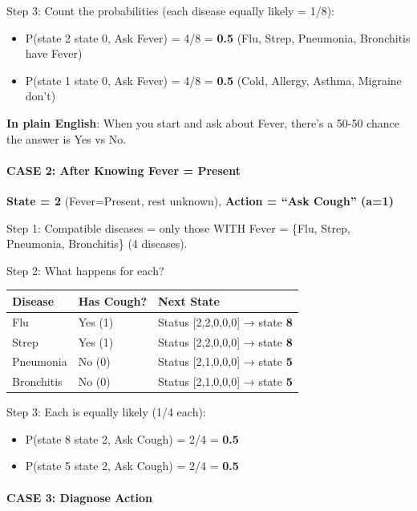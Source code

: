 \documentclass[
]{article}
\providecommand{\tightlist}{%
  \setlength{\itemsep}{0pt}\setlength{\parskip}{0pt}}
\begin{document}
Step 3: Count the probabilities (each disease equally likely = 1/8):

\begin{itemize}
\tightlist
\item
  P(state 2 \textbar{} state 0, Ask Fever) = 4/8 = \textbf{0.5} (Flu,
  Strep, Pneumonia, Bronchitis have Fever)
\item
  P(state 1 \textbar{} state 0, Ask Fever) = 4/8 = \textbf{0.5} (Cold,
  Allergy, Asthma, Migraine don't)
\end{itemize}

\textbf{In plain English}: When you start and ask about Fever, there's a
50-50 chance the answer is Yes vs No.

\hypertarget{case-2-after-knowing-fever-present}{%
\paragraph{CASE 2: After Knowing Fever =
Present}\label{case-2-after-knowing-fever-present}}

\textbf{State = 2} (Fever=Present, rest unknown), \textbf{Action = ``Ask
Cough'' (a=1)}

Step 1: Compatible diseases = only those WITH Fever = \{Flu, Strep,
Pneumonia, Bronchitis\} (4 diseases).

Step 2: What happens for each?

\begin{longtable}[]{@{}lll@{}}
\toprule
Disease & Has Cough? & Next State \\
\midrule
\endhead
Flu & Yes (1) & Status {[}2,2,0,0,0{]} → state \textbf{8} \\
Strep & Yes (1) & Status {[}2,2,0,0,0{]} → state \textbf{8} \\
Pneumonia & No (0) & Status {[}2,1,0,0,0{]} → state \textbf{5} \\
Bronchitis & No (0) & Status {[}2,1,0,0,0{]} → state \textbf{5} \\
\bottomrule
\end{longtable}

Step 3: Each is equally likely (1/4 each):

\begin{itemize}
\tightlist
\item
  P(state 8 \textbar{} state 2, Ask Cough) = 2/4 = \textbf{0.5}
\item
  P(state 5 \textbar{} state 2, Ask Cough) = 2/4 = \textbf{0.5}
\end{itemize}

\hypertarget{case-3-diagnose-action}{%
\paragraph{CASE 3: Diagnose Action}\label{case-3-diagnose-action}}
\end{document}
